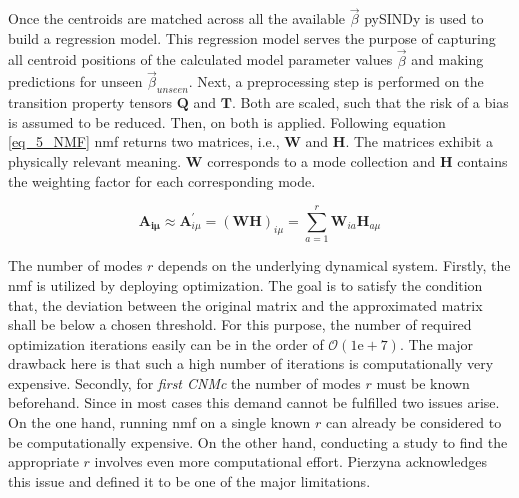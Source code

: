 Once the centroids are matched across all the available $\vec{\beta}$ pySINDy \cite{Brunton2016,Silva2020, Kaptanoglu2022} is used
to build a regression model. This regression model serves the purpose 
of capturing all centroid positions of the calculated model parameter
values $\vec{\beta }$ and making predictions for unseen $\vec{\beta}_{unseen}$. 
Next, a preprocessing step is performed on the
transition property tensors $\bm Q$ and $\bm T$. Both are
scaled, such that the risk of a bias is assumed to be reduced. 
Then, on both  \cite{Lee1999} is
applied. 
Following equation \eqref{eq_5_NMF} \gls{nmf} \cite{Lee1999} returns
two matrices, i.e., $\bm W$ and $\bm H$. 
The matrices exhibit a physically
relevant meaning. $\bm W$ corresponds to a mode collection and $\bm H$ contains 
the weighting factor for each corresponding mode.\newline

\begin{equation}
    \label{eq_5_NMF}
    \bm {A_{i \mu}} \approx \bm A^{\prime}_{i \mu}  = (\bm W  \bm H)_{i \mu}  = \sum_{a = 1}^{r} 
    \bm W_{ia} \bm H_{a \mu}
\end{equation}

The number of modes $r$ depends on the underlying dynamical system.
Firstly, the \gls{nmf} is utilized by deploying optimization. 
The goal is to satisfy the condition that, the deviation between the original matrix and the approximated matrix shall be below a chosen threshold. 
For this purpose, the number of required optimization iterations easily can be 
in the order of $\mathcal{O} (1 \mathrm{e}+7)$. The major drawback here is that such a high number of iterations is computationally very expensive.
Secondly, for \emph{first CNMc} the number of modes $r$ must be known beforehand. 
Since in most cases this demand cannot be fulfilled two issues arise. 
On the one hand, running \gls{nmf} on a single known $r$ can already be considered to be computationally expensive.
On the other hand, conducting a study to find the appropriate $r$ involves even more computational effort. 
Pierzyna \cite[]{Max2021} acknowledges this issue and defined it to be one of the major limitations. \newline


